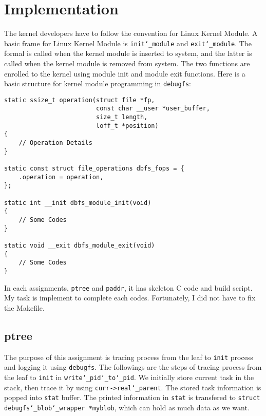 \chapter{Implementation}


The kernel developers have to follow the convention for Linux Kernel Module.
A basic frame for Linux Kernel Module is \texttt{init\char`_module} and \texttt{exit\char`_module}.
The formal is called when the kernel module is inserted to system, and the latter is called when the kernel module is removed from system.
The two functions are enrolled to the kernel using module init and module exit functions.
Here is a basic structure for kernel module programming in \texttt{debugfs}:

\begin{lstlisting}
static ssize_t operation(struct file *fp, 
                         const char __user *user_buffer, 
                         size_t length, 
                         loff_t *position)
{
    // Operation Details
}

static const struct file_operations dbfs_fops = {
    .operation = operation,
};

static int __init dbfs_module_init(void)
{
    // Some Codes
}

static void __exit dbfs_module_exit(void)
{
    // Some Codes
}
\end{lstlisting}

In each assignments, \texttt{ptree} and \texttt{paddr}, it has skeleton C code and build script.
My task is implement to complete each codes.
Fortunately, I did not have to fix the Makefile.

\section{ptree}
The purpose of this assignment is tracing process from the leaf to \texttt{init} process and logging it using \texttt{debugfs}.
The followings are the steps of tracing process from the leaf to \texttt{init} in \texttt{write\char`_pid\char`_to\char`_pid}.
We initially store current task in the stack, then trace it by using \texttt{curr->real\char`_parent}.
The stored task information is popped into \texttt{stat} buffer.
The printed information in \texttt{stat} is transfered to \texttt{struct debugfs\char`_blob\char`_wrapper *myblob}, which can hold as much data as we want.

